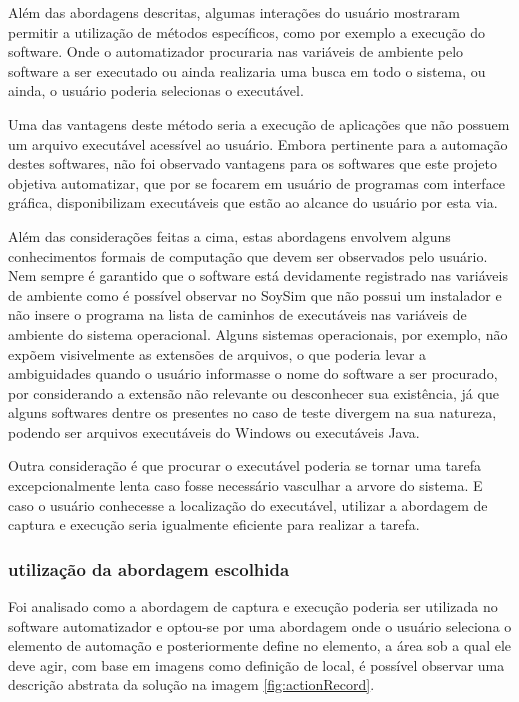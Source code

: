 \documentclass[tg]{mdtufsm}
\begin{document}
                Além das abordagens descritas, algumas interações do usuário mostraram permitir a utilização de métodos específicos, como por exemplo a execução do software. Onde o automatizador procuraria nas variáveis de ambiente pelo software a ser executado ou ainda realizaria uma busca em todo o sistema, ou ainda, o usuário poderia selecionas o executável.

                Uma das vantagens deste método seria a execução de aplicações que não possuem um arquivo executável acessível ao usuário. Embora pertinente para a automação destes softwares, não foi observado vantagens para os softwares que este projeto objetiva automatizar, que por se focarem em usuário de programas com interface gráfica, disponibilizam executáveis que estão ao alcance do usuário por esta via.

                Além das considerações feitas a cima, estas abordagens envolvem alguns conhecimentos formais de computação que devem ser observados pelo usuário. Nem sempre é garantido que o software está devidamente registrado nas variáveis de ambiente como é possível observar no SoySim que não possui um instalador e não insere o programa na lista de caminhos de executáveis nas variáveis de ambiente do sistema operacional.
                Alguns sistemas operacionais, por exemplo, não expõem visivelmente as extensões de arquivos, o que poderia levar a ambiguidades quando o usuário informasse o nome do software a ser procurado, por considerando a extensão não relevante ou desconhecer sua existência, já que alguns softwares dentre os presentes no caso de teste divergem na sua natureza, podendo ser arquivos executáveis do Windows ou executáveis Java.

                Outra consideração é que procurar o executável poderia se tornar uma tarefa excepcionalmente lenta caso fosse necessário vasculhar a arvore do sistema. E caso o usuário conhecesse a localização do executável, utilizar a abordagem de captura e execução seria igualmente eficiente para realizar a tarefa.

                \subsubsection {utilização da abordagem escolhida}

                Foi analisado como a abordagem de captura e execução poderia ser utilizada no software automatizador e optou-se por uma abordagem onde o usuário seleciona o elemento de automação e posteriormente define no elemento, a área sob a qual ele deve agir, com base em imagens como definição de local, é possível observar uma descrição abstrata da solução na imagem \ref{fig:actionRecord}.
\end{document}
